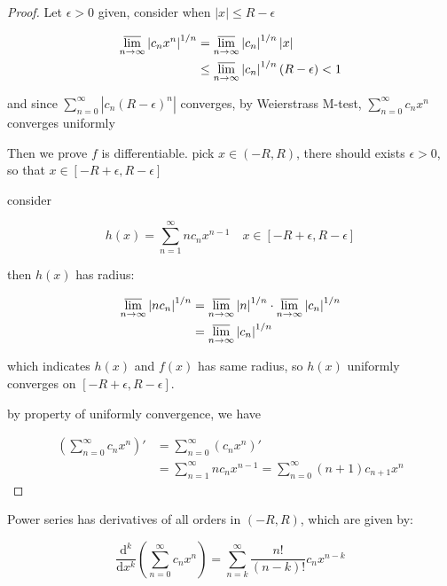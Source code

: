 \begin{proof}
    Let $\epsilon > 0$ given, consider when $|x| \le R - \epsilon$

    \begin{align*}
        \varlimsup_{n \to \infty}\left| c_n x^n \right|^{1/n} &= \varlimsup_{n \to \infty}\left| c_n\right|^{1/n} \left| x \right| \\
        & \le \varlimsup_{n \to \infty}\left| c_n\right|^{1/n} (R-\epsilon) < 1
    \end{align*}

    and since $\sum_{n=0}^{\infty}\left| c_n (R-\epsilon)^n \right|$ converges, 
    by Weierstrass M-test, $\sum_{n=0}^{\infty} c_n x^n$ converges uniformly

    Then we prove $f$ is differentiable. pick $x \in (-R, R)$, there should exists $\epsilon > 0$,
    so that $x \in [-R + \epsilon, R -\epsilon]$

    consider 

    \[
        h(x) = \sum_{n=1}^{\infty}nc_nx^{n-1} \quad x \in [-R + \epsilon, R - \epsilon]
    \]

    then $h(x)$ has radius:

    \begin{align*}
        \varlimsup_{n \to \infty} \left| nc_n \right| ^{1/n} &= \varlimsup_{n \to \infty} \left| n \right| ^{1/n} \cdot \varlimsup_{n \to \infty} \left| c_n \right| ^{1/n} \\
        &= \varlimsup_{n \to \infty} \left| c_n \right| ^{1/n}
    \end{align*}

    which indicates $h(x)$ and $f(x)$ has same radius, so $h(x)$ uniformly converges on $[-R + \epsilon, R-\epsilon]$.

    by property of uniformly convergence, we have

    \begin{align*}
        \left(\sum_{n=0}^{\infty} c_n x^n \right)' &= \sum_{n=0}^{\infty} \left(c_n x^n \right)' \\
        &= \sum_{n=1}^{\infty} nc_nx^{n-1} = \sum_{n=0}^{\infty}(n+1)c_{n+1}x^n
    \end{align*}
\end{proof}

\begin{corollary}
    Power series has derivatives of all orders in $(-R, R)$, which are given by:

    \[
        \frac{\mathrm{d}^k}{\mathrm{d}x^k}\left( \sum_{n=0}^{\infty}c_n x^n \right) = \sum_{n=k}^{\infty}\frac{n!}{(n-k)!}c_nx^{n-k}
    \]

\end{corollary}

